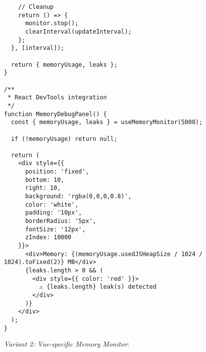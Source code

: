 \documentclass[11pt]{article}
\begin{document}
\begin{verbatim}
    // Cleanup
    return () => {
      monitor.stop();
      clearInterval(updateInterval);
    };
  }, [interval]);
  
  return { memoryUsage, leaks };
}

/**
 * React DevTools integration
 */
function MemoryDebugPanel() {
  const { memoryUsage, leaks } = useMemoryMonitor(5000);
  
  if (!memoryUsage) return null;
  
  return (
    <div style={{
      position: 'fixed',
      bottom: 10,
      right: 10,
      background: 'rgba(0,0,0,0.8)',
      color: 'white',
      padding: '10px',
      borderRadius: '5px',
      fontSize: '12px',
      zIndex: 10000
    }}>
      <div>Memory: {(memoryUsage.usedJSHeapSize / 1024 / 1024).toFixed(2)} MB</div>
      {leaks.length > 0 && (
        <div style={{ color: 'red' }}>
          ⚠️ {leaks.length} leak(s) detected
        </div>
      )}
    </div>
  );
}
\end{verbatim}

\emph{Variant 2: Vue-specific Memory Monitor}:
\end{document}
